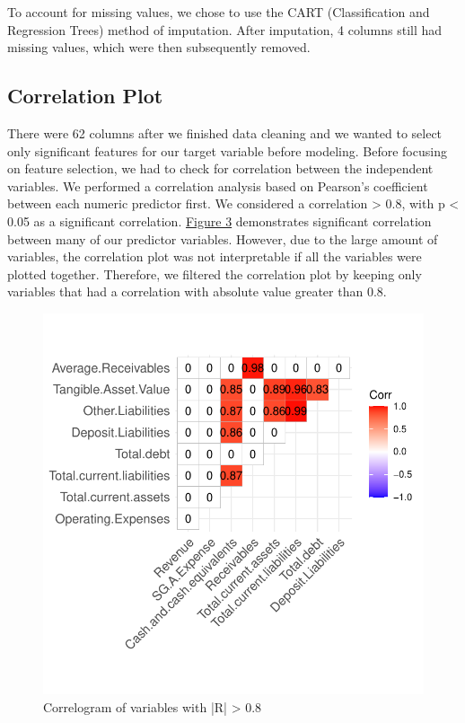 \documentclass[11pt,]{article}
\begin{document}
To account for missing values, we chose to use the CART (Classification
and Regression Trees) method of imputation. After imputation, 4 columns
still had missing values, which were then subsequently removed.

\hypertarget{correlation-plot}{%
\subsection{Correlation Plot}\label{correlation-plot}}

There were 62 columns after we finished data cleaning and we wanted to
select only significant features for our target variable before
modeling. Before focusing on feature selection, we had to check for
correlation between the independent variables. We performed a
correlation analysis based on Pearson's coefficient between each numeric
predictor first. We considered a \textbar correlation\textbar{}
\textgreater{} 0.8, with p \textless{} 0.05 as a significant
correlation. \hyperref[sec:fig3]{Figure 3} demonstrates significant
correlation between many of our predictor variables. However, due to the
large amount of variables, the correlation plot was not interpretable if
all the variables were plotted together. Therefore, we filtered the
correlation plot by keeping only variables that had a correlation with
absolute value greater than 0.8.

\begin{figure}

{\centering \includegraphics{stock_analysis_files/figure-latex/corrplot-1} 

}

\caption{Correlogram of variables with |R| > 0.8}\label{fig:corrplot}
\end{figure}
\end{document}
